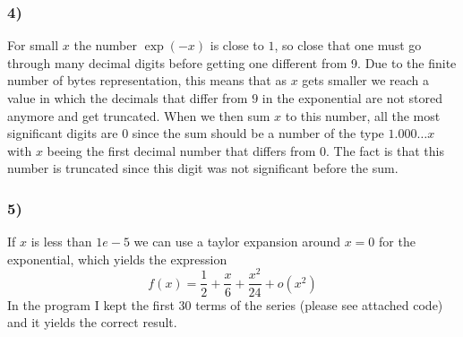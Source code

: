 \documentclass{article}
\begin{document}
\subsubsection*{4)}
For small $x$ the number $\exp(-x)$ is close to $1$, so close that one must go through many decimal digits before getting one different from 9. Due to  the finite number of bytes representation, 
this means that as $x$ gets smaller we reach a value in which the decimals that differ from $9$ in the exponential are not stored anymore and get truncated. When we then sum $x$ to this number, all the most significant digits are 0 since the sum should be a number 
of the type $1.000\dots x$ with $x$ beeing the first decimal number that differs from 0. The fact is that this number is truncated since this digit was not significant before the sum.
\subsubsection*{5)}
If $x$ is less than $1e-5$ we can use a taylor expansion around $x=0$ for the exponential, which yields the expression
\begin{equation*}
    f(x) = \frac{1}{2} + \frac{x}{6} + \frac{x^2}{24} + o(x^2)
\end{equation*}
In the program I kept the first 30 terms of the series (please see attached code) and it yields the correct result.
\end{document}
